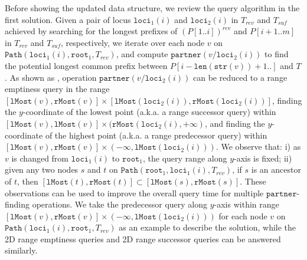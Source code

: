 \documentclass[smallabstract,smallcaptions]{dccpaper}
\def\idtt#1{\ensuremath{\mathtt{#1}}}
\def\str{\idtt{str}}
\def\partner{\idtt{partner}}
\def\path{\idtt{Path}}
\def\loci{\idtt{loci}}
\def\lMost{\idtt{lMost}}
\def\rMost{\idtt{rMost}}
\def\len{\idtt{len}}
\def\root{\idtt{root}}
\begin{document}
Before showing the updated data structure, we review the query algorithm in the first solution.
Given a pair of locus $\loci_1(i)$ and $\loci_2(i)$ in $T_{rev}$ and $T_{suf}$ achieved by searching for the longest prefixes of $(P[1..i])^{rev}$ and $P[i+1..m]$ in $T_{rev}$ and $T_{suf}$, respectively, we iterate over each node $v$ on $\path(\loci_1(i), \root_1, T_{rev})$, and compute $\partner(v/\loci_2(i))$ to find the potential longest common prefix between $P[i-\len(\str(v))+1..]$ and $T$.
As shown as \cite[Lemma 10]{abedin2018heaviest}, operation $\partner(v/\loci_2(i))$ can be reduced to a range emptiness query in the range $[\lMost(v), \rMost(v)]\times[\lMost(\loci_2(i)), \rMost(\loci_2(i))]$, finding the $y$-coordinate of the lowest point (a.k.a. a range successor query) within $[\lMost(v), \lMost(v)]\times(\rMost(\loci_2(i), +\infty)$, and finding the $y$-coordinate of the highest point (a.k.a. a range predecessor query) within $[\lMost(v), \rMost(v)]\times(-\infty, \lMost(\loci_2(i)))$.
We observe that: i) as $v$ is changed from $\loci_1(i)$ to $\root_1$, the query range along $y$-axis is fixed;
ii) given any two nodes $s$ and $t$ on $\path(\root_1, \loci_1(i), T_{rev})$, if $s$ is an ancestor of $t$, then $[\lMost(t), \rMost(t)] \subset [\lMost(s), \rMost(s)]$.
These observations can be used to improve the overall query time for multiple $\partner$-finding operations.
We take the predecessor query along $y$-axis within range $[\lMost(v), \rMost(v)]\times(-\infty, \lMost(\loci_2(i)))$ for each node $v$ on $\path(\loci_1(i), \root_1, T_{rev})$ as an example to describe the solution, while the 2D range emptiness queries and 2D range successor queries can be answered similarly.
\end{document}
